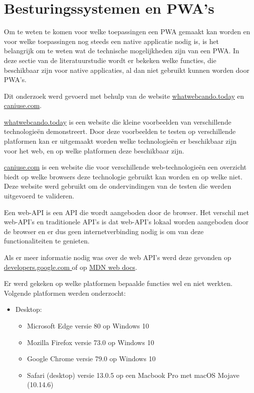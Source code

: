 \clearpage
\section{Besturingssystemen en PWA's}
	\label{ch: BesturingssystemenEnPWAs}
	
	Om te weten te komen voor welke toepassingen een PWA gemaakt kan worden en voor welke toepassingen nog steeds een native applicatie nodig is, is het belangrijk om te weten wat de technische mogelijkheden zijn van een PWA. In deze sectie van de literatuurstudie wordt er bekeken welke functies, die beschikbaar zijn voor native applicaties, al dan niet gebruikt kunnen worden door PWA's.
	
	Dit onderzoek werd gevoerd met behulp van de website \href{https://whatwebcando.today/}{whatwebcando.today} en
	\href{https://caniuse.com/}{caniuse.com}.
	
	                                 
	\href{https://whatwebcando.today/}{whatwebcando.today} is een website die kleine voorbeelden van verschillende technologieën demonstreert. Door deze voorbeelden te testen op verschillende platformen kan er uitgemaakt worden welke technologieën er beschikbaar zijn voor het web, en op welke platformen deze beschikbaar zijn.
	
	\href{https://caniuse.com/}{ caniuse.com} is een website die voor verschillende web-technologieën een overzicht biedt op welke browsers deze technologie gebruikt kan worden en op welke niet. Deze website werd gebruikt om de ondervindingen van de testen die werden uitgevoerd te valideren. 
	
	Een web-API is een API die wordt aangeboden door de browser. Het verschil met web-API's en traditionele API's is dat web-API's lokaal worden aangeboden door de browser en er dus geen internetverbinding nodig is om van deze functionaliteiten te genieten.
	\autocite{Mozilla2019c}
	
	
	Als er meer informatie nodig was over de web API's werd deze gevonden op \href{https://developers.google.com/}{developers.google.com } of op \href{https://developer.mozilla.org/nl/}{MDN web docs}.
	
	Er werd gekeken op welke platformen bepaalde functies wel en niet werkten. Volgende platformen werden onderzocht:
	\begin{itemize}
	   \item Desktop:
	   \begin{itemize}
	     \item	Microsoft Edge versie 80 op Windows 10
	     \item	Mozilla Firefox versie 73.0 op Windows 10
	     \item	Google Chrome versie 79.0 op Windows 10
	     \item  Safari (desktop) versie 13.0.5 op een Macbook Pro met macOS Mojave (10.14.6)
	   \end{itemize}
	\end{itemize}
	
